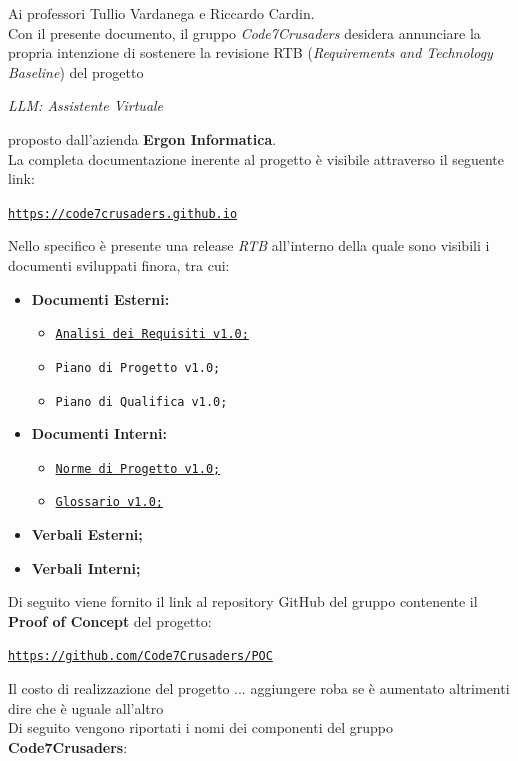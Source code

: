 \documentclass{article}
\begin{document}
Ai professori Tullio Vardanega e Riccardo Cardin.\\
Con il presente documento, il gruppo \textit{Code7Crusaders} desidera annunciare la propria intenzione di sostenere
la revisione RTB (\textit{Requirements and Technology Baseline}) del progetto
\begin{center}
    \textit{LLM: Assistente Virtuale}
\end{center}
proposto dall'azienda \textbf{Ergon Informatica}.\\
La completa documentazione inerente al progetto è visibile attraverso il seguente link:
\begin{center}
    \texttt{\url{https://code7crusaders.github.io}}
\end{center}
Nello specifico è presente una release \textit{RTB} all'interno della quale sono visibili i documenti sviluppati finora, tra cui:
\begin{itemize}
    \item \textbf{Documenti Esterni:}
    \begin{itemize}
        \item \href{https://code7crusaders.github.io/docs/RTB/documentazione_esterna/analisi_dei_requisiti/analisi_dei_requisiti.html}{\texttt{Analisi dei Requisiti v1.0;}}
        \item \texttt{Piano di Progetto v1.0;}
        \item \texttt{Piano di Qualifica v1.0;}
    \end{itemize}
    \item \textbf{Documenti Interni:}
    \begin{itemize}
        \item \href{https://code7crusaders.github.io/docs/RTB/documentazione_interna/norme_di_progetto.html}{\texttt{Norme di Progetto v1.0;}}
        \item \href{https://code7crusaders.github.io/docs/RTB/documentazione_interna/glossario.html}{\texttt{Glossario v1.0;}}
    \end{itemize}
    \item \textbf{Verbali Esterni;}
    \item \textbf{Verbali Interni;}
\end{itemize}

Di seguito viene fornito il link al repository GitHub del gruppo contenente il \textbf{Proof of Concept} del progetto:
\begin{center}
    \texttt{\url{https://github.com/Code7Crusaders/POC}}
\end{center}
Il costo di realizzazione del progetto ... aggiungere roba se è aumentato altrimenti dire che è uguale all'altro\\
\newpage
Di seguito vengono riportati i nomi dei componenti del gruppo \textbf{Code7Crusaders}:\\
\end{document}
